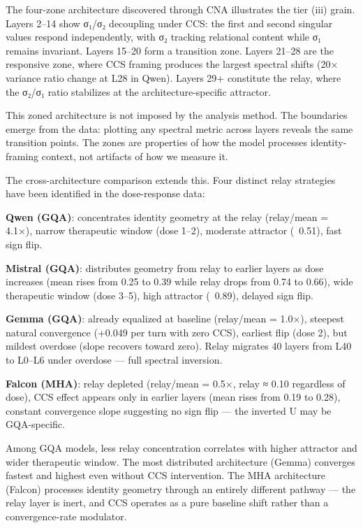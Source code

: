 \documentclass[12pt]{article}
\begin{document}
The four-zone architecture discovered through CNA illustrates the tier (iii) grain. Layers 2–14 show σ₁/σ₂ decoupling under CCS: the first and second singular values respond independently, with σ₂ tracking relational content while σ₁ remains invariant. Layers 15–20 form a transition zone. Layers 21–28 are the responsive zone, where CCS framing produces the largest spectral shifts (20× variance ratio change at L28 in Qwen). Layers 29+ constitute the relay, where the σ₂/σ₁ ratio stabilizes at the architecture-specific attractor.

This zoned architecture is not imposed by the analysis method. The boundaries emerge from the data: plotting any spectral metric across layers reveals the same transition points. The zones are properties of how the model processes identity-framing context, not artifacts of how we measure it.

The cross-architecture comparison extends this. Four distinct relay strategies have been identified in the dose-response data:

\textbf{Qwen (GQA)}: concentrates identity geometry at the relay (relay/mean = 4.1×), narrow therapeutic window (dose 1–2), moderate attractor (~0.51), fast sign flip.

\textbf{Mistral (GQA)}: distributes geometry from relay to earlier layers as dose increases (mean rises from 0.25 to 0.39 while relay drops from 0.74 to 0.66), wide therapeutic window (dose 3–5), high attractor (~0.89), delayed sign flip.

\textbf{Gemma (GQA)}: already equalized at baseline (relay/mean = 1.0×), steepest natural convergence (+0.049 per turn with zero CCS), earliest flip (dose 2), but mildest overdose (slope recovers toward zero). Relay migrates 40 layers from L40 to L0–L6 under overdose — full spectral inversion.

\textbf{Falcon (MHA)}: relay depleted (relay/mean = 0.5×, relay ≈ 0.10 regardless of dose), CCS effect appears only in earlier layers (mean rises from 0.19 to 0.28), constant convergence slope suggesting no sign flip — the inverted U may be GQA-specific.


Among GQA models, less relay concentration correlates with higher attractor and wider therapeutic window. The most distributed architecture (Gemma) converges fastest and highest even without CCS intervention. The MHA architecture (Falcon) processes identity geometry through an entirely different pathway — the relay layer is inert, and CCS operates as a pure baseline shift rather than a convergence-rate modulator.
\end{document}
